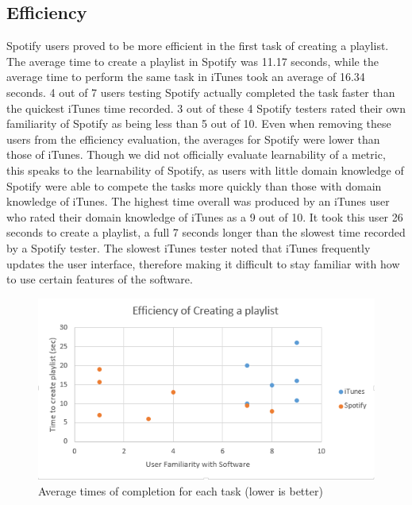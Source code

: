 \documentclass[12pt]{article}
\begin{document}
\subsection{Efficiency}

Spotify users proved to be more efficient in the first task of 
creating a playlist. The average time to create a playlist in 
Spotify was 11.17 seconds, while the average time to perform the 
same task in iTunes took an average of 16.34 seconds. 4 out of 7 
users testing Spotify actually completed the task faster than the 
quickest iTunes time recorded. 3 out of these 4 Spotify testers 
rated their own familiarity of Spotify as being less than 5 out of 
10. Even when removing these users from the efficiency evaluation, 
the averages for Spotify were lower than those of iTunes. Though 
we did not officially evaluate learnability of a metric, this 
speaks to the learnability of Spotify, as users with little domain 
knowledge of Spotify were able to compete the tasks more quickly 
than those with domain knowledge of iTunes.
The highest time 
overall was produced by an iTunes user who rated their domain 
knowledge of iTunes as a 9 out of 10. It took this user 26 seconds 
to create a playlist, a full 7 seconds longer than the slowest 
time recorded by a Spotify tester. The slowest iTunes tester noted 
that iTunes frequently updates the user interface, therefore 
making it difficult to stay familiar with how to use certain 
features of the software.

\begin{figure}[H]
	\includegraphics[width=\textwidth]{chart1.png}
	\caption{Average times of completion for each task (lower 
is better)}
\end{figure}
\end{document}

